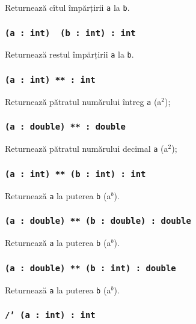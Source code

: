 Returnează cîtul împărțirii \texttt{a} la \texttt{b}.

\subsubsection{\texttt{(a : int) \ (b : int) : int}}

Returnează restul împărțirii \texttt{a} la \texttt{b}.


\subsubsection{\texttt{(a : int) ** : int}}

Returnează pătratul numărului întreg \texttt{a} (a$^2$);

\subsubsection{\texttt{(a : double) ** : double}}

Returnează pătratul numărului decimal \texttt{a} (a$^2$);

\subsubsection{\texttt{(a : int) ** (b : int) : int}}

Returnează \texttt{a} la puterea \texttt{b} (a$^b$).

\subsubsection{\texttt{(a : double) ** (b : double) : double}}

Returnează \texttt{a} la puterea \texttt{b} (a$^b$).

\subsubsection{\texttt{(a : double) ** (b : int) : double}}

Returnează \texttt{a} la puterea \texttt{b} (a$^b$).

\subsubsection{\texttt{/' (a : int) : int}}

